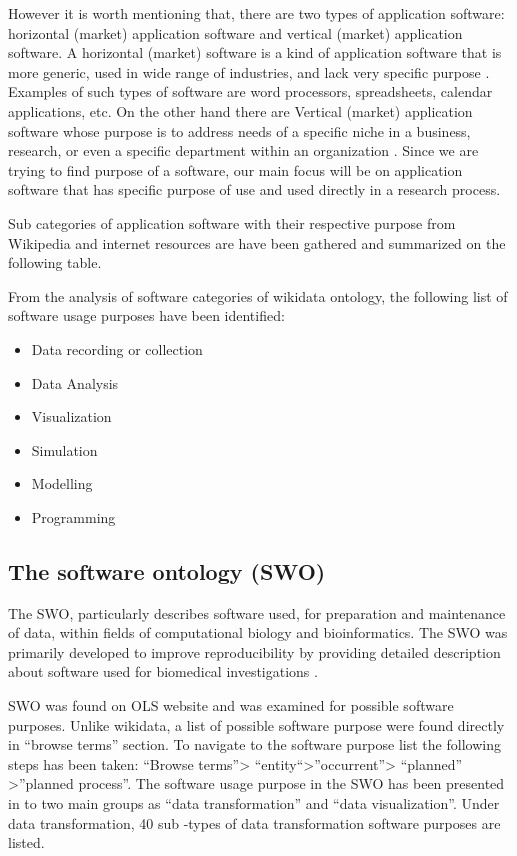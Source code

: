 However it is worth mentioning that, there are two types of application software: horizontal (market) application software and vertical (market) application software. A horizontal (market) software is a kind of application software that is more generic, used in wide range of industries, and lack very specific purpose \citep{enwiki:1034388659}.  Examples of such types of software are word processors, spreadsheets, calendar applications, etc. On the other hand there are Vertical (market) application software whose purpose is to address needs of a specific niche in a business, research, or even a specific department within an organization \citep{enwiki:879502666}. Since we are trying to find purpose of a software, our main focus will be on application software that has specific purpose of use and used directly in a research process.  

Sub categories of application software with their respective purpose from Wikipedia and internet resources are have been gathered and summarized on the following table. 


From the analysis of software categories of wikidata ontology, the following list of software usage purposes have been identified:

\begin{itemize}
	\item Data recording or collection 
	\item Data Analysis 
	\item Visualization
	\item Simulation
	\item Modelling
	\item Programming
	
\end{itemize}

\subsection{The software ontology (SWO)}

The \ac{SWO}, particularly describes software used, for preparation and maintenance of data, within fields of computational biology and bioinformatics.  The \ac{SWO} was primarily developed to improve reproducibility by providing detailed description about software used for biomedical investigations \cite{malone2014software}. 

\ac{SWO} was found on \ac{OLS} website and was examined for possible software purposes. Unlike wikidata, a list of possible software purpose were found directly in “browse terms” section.  To navigate to the software purpose list the following steps has been taken: “Browse terms”> “entity“>”occurrent”> “planned” >”planned process”.  The software usage purpose in the SWO has been presented in to two main groups as “data transformation” and “data visualization”.  Under data transformation, 40 sub -types of data transformation software purposes are listed. 

